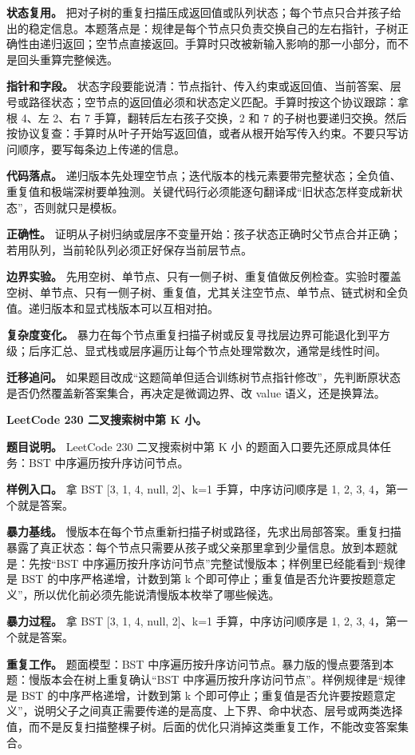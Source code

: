 \textbf{状态复用。} 把对子树的重复扫描压成返回值或队列状态；每个节点只合并孩子给出的稳定信息。本题落点是：规律是每个节点只负责交换自己的左右指针，子树正确性由递归返回；空节点直接返回。手算时只改被新输入影响的那一小部分，而不是回头重算完整候选。

\textbf{指针和字段。} 状态字段要能说清：节点指针、传入约束或返回值、当前答案、层号或路径状态；空节点的返回值必须和状态定义匹配。手算时按这个协议跟踪：拿根 4、左 2、右 7 手算，翻转后左右孩子交换，2 和 7 的子树也要递归交换。然后按协议复查：手算时从叶子开始写返回值，或者从根开始写传入约束。不要只写访问顺序，要写每条边上传递的信息。

\textbf{代码落点。} 递归版本先处理空节点；迭代版本的栈元素要带完整状态；全负值、重复值和极端深树要单独测。关键代码行必须能逐句翻译成“旧状态怎样变成新状态”，否则就只是模板。

\textbf{正确性。} 证明从子树归纳或层序不变量开始：孩子状态正确时父节点合并正确；若用队列，当前轮队列必须正好保存当前层节点。

\textbf{边界实验。} 先用空树、单节点、只有一侧子树、重复值做反例检查。实验时覆盖空树、单节点、只有一侧子树、重复值，尤其关注空节点、单节点、链式树和全负值。递归版本和显式栈版本可以互相对拍。

\textbf{复杂度变化。} 暴力在每个节点重复扫描子树或反复寻找层边界可能退化到平方级；后序汇总、显式栈或层序遍历让每个节点处理常数次，通常是线性时间。

\textbf{迁移追问。} 如果题目改成“这题简单但适合训练树节点指针修改”，先判断原状态是否仍然覆盖新答案集合，再决定是微调边界、改 value 语义，还是换算法。

\noindent\textbf{LeetCode 230 二叉搜索树中第 K 小。}

\textbf{题目说明。} LeetCode 230 二叉搜索树中第 K 小 的题面入口要先还原成具体任务：BST 中序遍历按升序访问节点。

\textbf{样例入口。} 拿 BST [3, 1, 4, null, 2]、k=1 手算，中序访问顺序是 1, 2, 3, 4，第一个就是答案。

\textbf{暴力基线。} 慢版本在每个节点重新扫描子树或路径，先求出局部答案。重复扫描暴露了真正状态：每个节点只需要从孩子或父亲那里拿到少量信息。放到本题就是：先按“BST 中序遍历按升序访问节点”完整试慢版本；样例里已经能看到“规律是 BST 的中序严格递增，计数到第 k 个即可停止；重复值是否允许要按题意定义”，所以优化前必须先能说清慢版本枚举了哪些候选。

\textbf{暴力过程。} 拿 BST [3, 1, 4, null, 2]、k=1 手算，中序访问顺序是 1, 2, 3, 4，第一个就是答案。

\textbf{重复工作。} 题面模型：BST 中序遍历按升序访问节点。暴力版的慢点要落到本题：慢版本会在树上重复确认“BST 中序遍历按升序访问节点”。样例规律是“规律是 BST 的中序严格递增，计数到第 k 个即可停止；重复值是否允许要按题意定义”，说明父子之间真正需要传递的是高度、上下界、命中状态、层号或两类选择值，而不是反复扫描整棵子树。后面的优化只消掉这类重复工作，不能改变答案集合。

